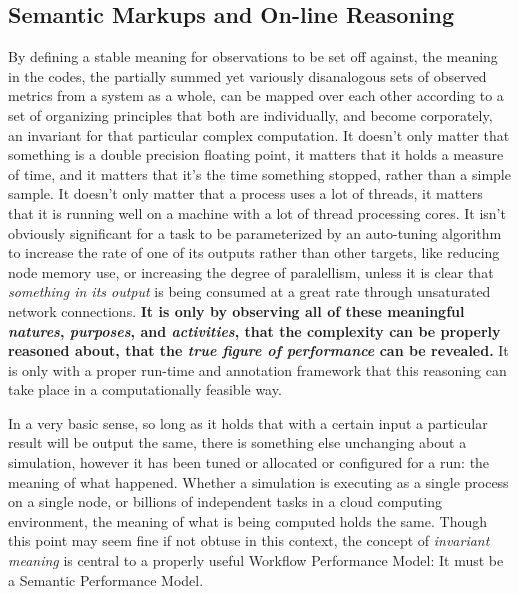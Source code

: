 %
%



\subsection{Semantic Markups and On-line Reasoning}
By defining a stable meaning for observations to be
set off against, the meaning in the codes, the partially summed yet
variously disanalogous sets of observed metrics from a system as a
whole, can be mapped over each other according to a set of organizing
principles that both are individually, and become corporately, an
invariant for that particular complex computation.
%
It doesn't only matter that something is a double precision floating
point, it matters that it holds a measure of time, and it matters that
it's the time something stopped, rather than a simple sample.
%
It doesn't only matter that a process uses a lot of threads, it
matters that it is running well on a machine with a lot of thread
processing cores.
%
It isn't obviously significant for a task to be parameterized by an
auto-tuning algorithm to increase the rate of one of its outputs
rather than other targets, like reducing node memory use, or
increasing the degree of paralellism, unless it is clear that
\textit{something in its output} is being consumed at a great rate
through unsaturated network connections.
%
\textbf{It is only by observing all of these meaningful
  \textit{natures}, \textit{purposes}, and \textit{activities}, that
  the complexity can be properly reasoned about, that the \textit{true
    figure of performance} can be revealed.}
%
It is only with a proper run-time and annotation framework that this
reasoning can take place in a computationally feasible way.

In a very basic sense, so long as it holds that with a certain input a
particular result will be output the same, there is something else
unchanging about a simulation, however it has been tuned or allocated
or configured for a run: the meaning of what happened.
%
Whether a simulation is executing as a single process on a single
node, or billions of independent tasks in a cloud computing
environment, the meaning of what is being computed holds the
same.
%
Though this point may seem fine if not obtuse in this context, the
concept of \textit{invariant meaning} is central to a properly useful
Workflow Performance Model: It must be a Semantic Performance Model.

